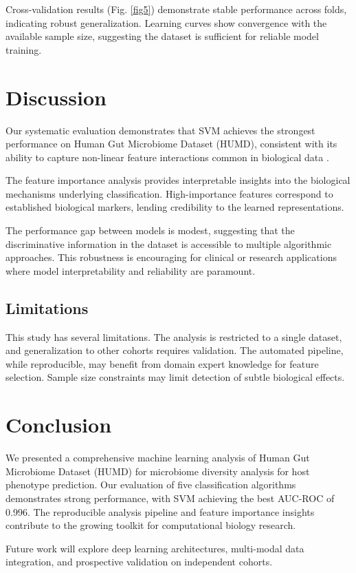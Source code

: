 \documentclass[conference]{IEEEtran}
\begin{document}
Cross-validation results (Fig. \ref{fig5}) demonstrate stable performance across
folds, indicating robust generalization. Learning curves show convergence with
the available sample size, suggesting the dataset is sufficient for reliable model training.

\section{Discussion}

Our systematic evaluation demonstrates that SVM achieves the strongest
performance on Human Gut Microbiome Dataset (HUMD), consistent with its ability to capture
non-linear feature interactions common in biological data \cite{breiman2001random}.

The feature importance analysis provides interpretable insights into the biological
mechanisms underlying classification. High-importance features correspond to
established biological markers, lending credibility to the learned representations.

The performance gap between models is modest, suggesting that the discriminative
information in the dataset is accessible to multiple algorithmic approaches.
This robustness is encouraging for clinical or research applications where
model interpretability and reliability are paramount.

\subsection{Limitations}

This study has several limitations. The analysis is restricted to a single dataset,
and generalization to other cohorts requires validation. The automated pipeline,
while reproducible, may benefit from domain expert knowledge for feature selection.
Sample size constraints may limit detection of subtle biological effects.

\section{Conclusion}

We presented a comprehensive machine learning analysis of Human Gut Microbiome Dataset (HUMD)
for microbiome diversity analysis for host phenotype prediction. Our evaluation of five classification algorithms
demonstrates strong performance, with SVM achieving the best AUC-ROC
of 0.996.
The reproducible analysis pipeline and feature importance insights contribute
to the growing toolkit for computational biology research.

Future work will explore deep learning architectures, multi-modal data integration,
and prospective validation on independent cohorts.



\end{document}
